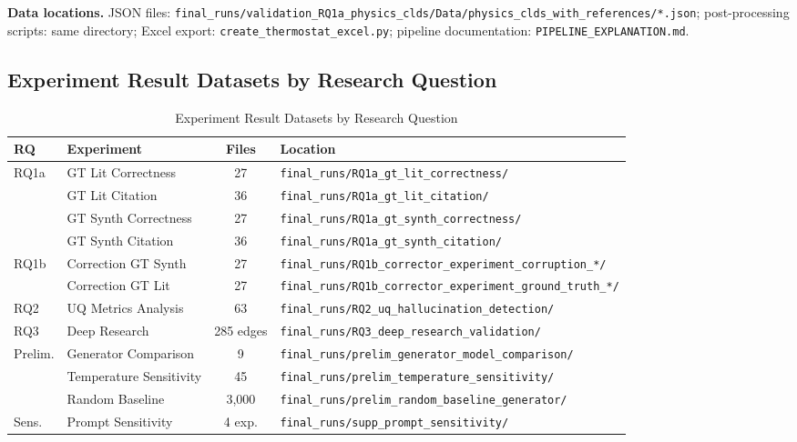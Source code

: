 \noindent\textbf{Data locations.} JSON files: \texttt{final\_runs/validation\_RQ1a\_physics\_clds/Data/physics\_clds\_with\_references/*.json}; post-processing scripts: same directory; Excel export: \texttt{create\_thermostat\_excel.py}; pipeline documentation: \texttt{PIPELINE\_EXPLANATION.md}.

\subsection{Experiment Result Datasets by Research Question}

\begin{table}[H]
\centering
\caption{Experiment Result Datasets by Research Question}
\label{tab:experiment_datasets}
\footnotesize
\begin{tabularx}{\textwidth}{@{}l l c X@{}}
\toprule
\textbf{RQ} & \textbf{Experiment} & \textbf{Files} & \textbf{Location} \\
\midrule
\multirow{4}{*}{RQ1a} 
  & GT Lit Correctness & 27 & \texttt{final\_runs/RQ1a\_gt\_lit\_correctness/} \\
  & GT Lit Citation & 36 & \texttt{final\_runs/RQ1a\_gt\_lit\_citation/} \\
  & GT Synth Correctness & 27 & \texttt{final\_runs/RQ1a\_gt\_synth\_correctness/} \\
  & GT Synth Citation & 36 & \texttt{final\_runs/RQ1a\_gt\_synth\_citation/} \\
\midrule
\multirow{2}{*}{RQ1b}
  & Correction GT Synth & 27 & \texttt{final\_runs/RQ1b\_corrector\_experiment\_corruption\_*/} \\
  & Correction GT Lit & 27 & \texttt{final\_runs/RQ1b\_corrector\_experiment\_ground\_truth\_*/} \\
\midrule
RQ2 & UQ Metrics Analysis & 63 & \texttt{final\_runs/RQ2\_uq\_hallucination\_detection/} \\
\midrule
RQ3 & Deep Research & 285 edges & \texttt{final\_runs/RQ3\_deep\_research\_validation/} \\
\midrule
\multirow{3}{*}{Prelim.}
  & Generator Comparison & 9 & \texttt{final\_runs/prelim\_generator\_model\_comparison/} \\
  & Temperature Sensitivity & 45 & \texttt{final\_runs/prelim\_temperature\_sensitivity/} \\
  & Random Baseline & 3,000 & \texttt{final\_runs/prelim\_random\_baseline\_generator/} \\
\midrule
Sens. & Prompt Sensitivity & 4 exp. & \texttt{final\_runs/supp\_prompt\_sensitivity/} \\
\bottomrule
\end{tabularx}
\end{table}

